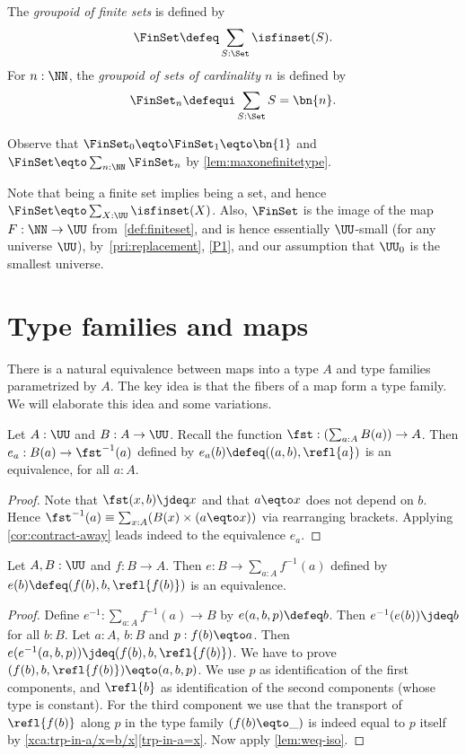 \begin{definition}\label{def:groupoidFin}
The \emph{groupoid of finite sets} is defined by
\[
  \FinSet\defeq\sum_{S:\Set}\isfinset(S).
\]
For $n:\NN$, the \emph{groupoid of sets of cardinality $n$} is defined by
\[
  \FinSet_n\defequi \sum_{S:\Set}{S=\bn{n}}.\qedhere
\]
\end{definition}
Observe that $\FinSet_0 \eqto \FinSet_1 \eqto \bn{1} $ and $\FinSet \eqto \sum_{n:\NN}\FinSet_n$
by \cref{lem:maxonefinitetype}.

Note that being a finite set implies being a set, and hence
$\FinSet \eqto \sum_{X:\UU}\isfinset(X)$.
Also, $\FinSet$ is the image of the map $F : \NN \to \UU$
from~\cref{def:finiteset}, and is hence essentially $\UU$-small
(for any universe $\UU$), by~\cref{pri:replacement}, \cref{P1}, and our assumption that $\UU_0$ is the smallest universe.

\section{Type families and maps}
\label{sec:typefam}

There is a natural equivalence between maps into a type $A$
and type families parametrized by $A$. The key idea is that the
fibers of a map form a type family. We will elaborate this
idea and some variations.


\begin{lemma}\label{lem:fst-fiber(a)=B(a)}
Let $A:\UU$ and $B:A\to\UU$.
Recall the function $\fst: (\sum_{a:A} B(a))\to A$.
Then $e_a: B(a) \to \fst^{-1}(a)$ defined by
$e_a(b)\defeq ((a,b),\refl{a})$ is an equivalence,
for all $a:A$.
\end{lemma}
\begin{proof}
Note that $\fst(x,b)\jdeq x$ and that $a \eqto x$ does
not depend on $b$. Hence
$\fst^{-1}(a) \equiv \sum_{x:A}  (B(x) \times (a \eqto x))$
via rearranging brackets.
Applying \cref{cor:contract-away} leads indeed to
the equivalence $e_a$.
\end{proof}

\begin{lemma}\label{lem:sum-of-fibers}
Let $A,B:\UU$ and $f:B\to A$.
Then $e: B \to \sum_{a:A} f^{-1}(a)$ defined by
$e(b)\defeq (f(b),b,\refl{f(b)})$ is an equivalence.
\end{lemma}
\begin{proof}
Define $e^{-1}: \sum_{a:A} f^{-1}(a) \to B$ by $e(a,b,p)\defeq b$.
Then $e^{-1}(e(b))\jdeq b$ for all $b:B$.
Let $a:A$, $b:B$ and $p: f(b) \eqto a$.
Then $e(e^{-1}(a,b,p))\jdeq (f(b),b,\refl{f(b)})$.
We have to prove $(f(b),b,\refl{f(b)}) \eqto (a,b,p)$.
We use $p$ as identification of the first components,
and $\refl{b}$ as identification of the second components
(whose type is constant). For the third component
we use that the transport of $\refl{f(b)}$ along $p$
in the type family $(f(b) \eqto \_)$ is indeed equal to $p$
itself by \cref{xca:trp-in-a/x=b/x}\ref{trp-in-a=x}.
Now apply \cref{lem:weq-iso}.
\end{proof}

